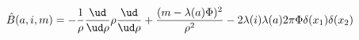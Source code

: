 \begin{equation}
\hat{B} (a, i, m) = -\frac{1}{\rho} \frac{\ud}{\ud\rho} \rho
\frac{\ud}{\ud\rho}
+ \frac{(m-\lambda(a) \Phi)^2}{\rho^2} -2 \lambda(i) \lambda(a)
2 \pi \Phi \delta(x_1) \delta(x_2)
\label{G7}
\end{equation}

